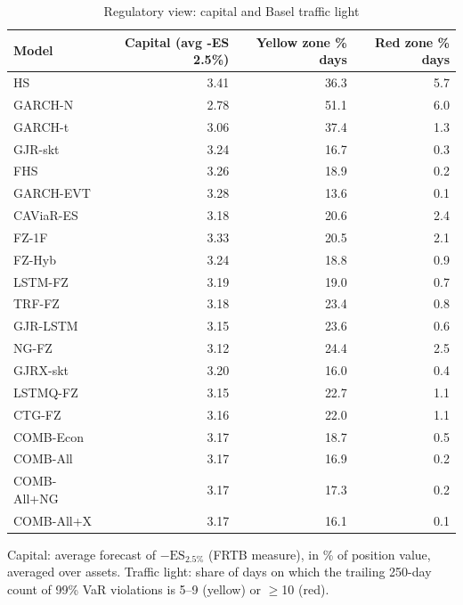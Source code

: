 \begin{table}[htbp]
\centering
\footnotesize
\caption{Regulatory view: capital and Basel traffic light}
\label{tab:reg}
\begin{tabular}{lrrr}
\toprule
Model & Capital (avg -ES 2.5\%) & Yellow zone \% days & Red zone \% days \\
\midrule
HS & 3.41 & 36.3 & 5.7 \\
GARCH-N & 2.78 & 51.1 & 6.0 \\
GARCH-t & 3.06 & 37.4 & 1.3 \\
GJR-skt & 3.24 & 16.7 & 0.3 \\
FHS & 3.26 & 18.9 & 0.2 \\
GARCH-EVT & 3.28 & 13.6 & 0.1 \\
CAViaR-ES & 3.18 & 20.6 & 2.4 \\
FZ-1F & 3.33 & 20.5 & 2.1 \\
FZ-Hyb & 3.24 & 18.8 & 0.9 \\
LSTM-FZ & 3.19 & 19.0 & 0.7 \\
TRF-FZ & 3.18 & 23.4 & 0.8 \\
GJR-LSTM & 3.15 & 23.6 & 0.6 \\
NG-FZ & 3.12 & 24.4 & 2.5 \\
GJRX-skt & 3.20 & 16.0 & 0.4 \\
LSTMQ-FZ & 3.15 & 22.7 & 1.1 \\
CTG-FZ & 3.16 & 22.0 & 1.1 \\
COMB-Econ & 3.17 & 18.7 & 0.5 \\
COMB-All & 3.17 & 16.9 & 0.2 \\
COMB-All+NG & 3.17 & 17.3 & 0.2 \\
COMB-All+X & 3.17 & 16.1 & 0.1 \\
\bottomrule
\end{tabular}
\par\smallskip\parbox{\linewidth}{\scriptsize Capital: average forecast of $-\mathrm{ES}_{2.5\%}$ (FRTB measure), in \% of position value, averaged over assets. Traffic light: share of days on which the trailing 250-day count of 99\% VaR violations is 5--9 (yellow) or $\geq$10 (red).}
\end{table}